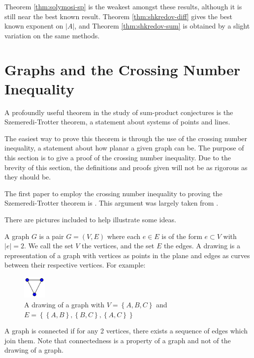 \documentclass[12pt,reqno]{amsart}
\begin{document}
Theorem \ref{thm:solymosi-sp} is the weakest amongst these results, although it is
still near the best known result.
Theorem \ref{thm:shkredov-diff} gives the best known exponent on \(\left\lvert A \right\rvert \), and
Theorem \ref{thm:shkredov-sum} is obtained by a slight variation on the same methods.

\section{Graphs and the Crossing Number Inequality}

A profoundly useful theorem in the study of sum-product conjectures is the
Szemeredi-Trotter theorem, a statement about systems of points and lines.

The easiest way to prove this theorem is through the use of the crossing number inequality,
a statement about how planar a given graph can be. The purpose of this section is to give a proof
of the crossing number inequality. Due to the brevity of this section, the definitions and proofs given will not be
as rigorous as they should be.

The first paper to employ the crossing number inequality to proving the Szemeredi-Trotter theorem is
\cite{szekely-SzT}. This argument was largely taken from \cite{tao-blog-CRI}.

There are pictures included to help illustrate some ideas. 

A graph \(G\) is a pair \(G = (V,E)\) where each \(e \in E\) is of the form \(e \subset V\) with \(\left\lvert e \right\rvert = 2\).
We call the set \(V\) the vertices, and the set \(E\) the edges. A drawing is
a representation of a graph with vertices as points in the plane and edges as curves between their
respective vertices. For example:

\begin{figure}[h]
    \centering
    \includegraphics[width=0.1\textwidth]{3graph.png}
    \caption{A drawing of a graph with \(V = \left\{ A,B,C \right\}\) and \(E = \left\{ \left\{ A,B \right\} , \left\{ B,C \right\} ,\left\{ A,C \right\}  \right\} \)}
\end{figure}

A graph is connected if for any 2 vertices, there exists a sequence of edges which join them.
Note that connectedness is a property of a graph and not of the drawing of a graph.
\end{document}

